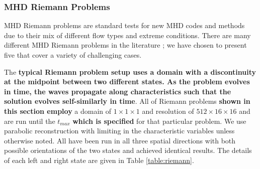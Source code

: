 \documentclass[modern, linenumbers]{aastex631}
\begin{document}
\subsubsection{MHD Riemann Problems}
\label{sec:riemann}

MHD Riemann problems are standard tests for new MHD codes and methods due to their mix of different flow types and extreme conditions. There are many different MHD Riemann problems in the literature \citep{brio_wu_1988, einfeldt_1991, ryu_jones_1995, dai_woodward_1998}; we have chosen to present five that cover a variety of challenging cases.

The \textbf{typical Riemann problem setup uses a domain with a discontinuity at the midpoint between two different states. As the problem evolves in time, the waves propagate along characteristics such that the solution evolves self-similarly in time}. All of Riemann problems \textbf{shown in this section employ} a domain of $1\times1\times1$ and resolution of $512\times16\times16$ and are run until the $t_{max}$ \textbf{which is specified} for that particular problem. We use parabolic reconstruction with limiting in the characteristic variables unless otherwise noted. All have been run in all three spatial directions with both possible orientations of the two states and achieved identical results. The details of each left and right state are given in Table \ref{table:riemann}.

\end{document}
